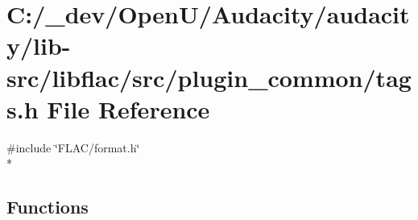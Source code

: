 \hypertarget{lib-src_2libflac_2src_2plugin__common_2tags_8h}{}\section{C\+:/\+\_\+dev/\+Open\+U/\+Audacity/audacity/lib-\/src/libflac/src/plugin\+\_\+common/tags.h File Reference}
\label{lib-src_2libflac_2src_2plugin__common_2tags_8h}
{\ttfamily \#include \char`\"{}F\+L\+A\+C/format.\+h\char`\"{}}\\*
\subsection*{Functions}
